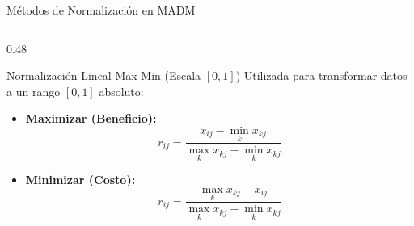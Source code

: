 \documentclass[aspectratio=169, 10pt]{beamer}
\begin{document}
\begin{frame}{Métodos de Normalización en MADM}
    \begin{columns}[T]
        \begin{column}{0.48\textwidth}
            \begin{block}{Normalización Lineal Max-Min (Escala $[0,1]$)}
                \scriptsize
                Utilizada para transformar datos a un rango $[0, 1]$ absoluto:
                \begin{itemize}
                    \item \textbf{Maximizar (Beneficio):}
                        \begin{equation*}
                            r_{ij} = \frac{x_{ij} - \min_k x_{kj}}{\max_k x_{kj} - \min_k x_{kj}}
                        \end{equation*}
                    \item \textbf{Minimizar (Costo):}
                        \begin{equation*}
                            r_{ij} = \frac{\max_k x_{kj} - x_{ij}}{\max_k x_{kj} - \min_k x_{kj}}
                        \end{equation*}
                \end{itemize}
            \end{block}
        \end{column}
        

\end{columns}
\end{frame}
\end{document}
